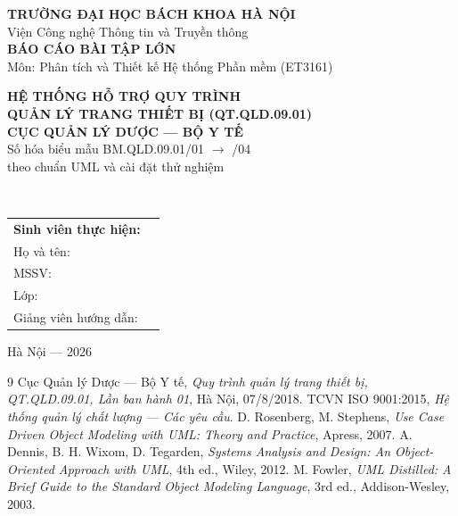 \documentclass[12pt, a4paper]{report}
\begin{document}
\begin{titlepage}
\centering
{\Large \textbf{TRƯỜNG ĐẠI HỌC BÁCH KHOA HÀ NỘI}}\\[2pt]
{\large Viện Công nghệ Thông tin và Truyền thông}\\[40pt]
{\Huge\bfseries BÁO CÁO BÀI TẬP LỚN}\\[10pt]
{\Large Môn: Phân tích và Thiết kế Hệ thống Phần mềm (ET3161)}\\[36pt]
\begin{minipage}{0.86\textwidth}
\centering
{\Large\bfseries HỆ THỐNG HỖ TRỢ QUY TRÌNH\\ QUẢN LÝ TRANG THIẾT BỊ (QT.QLD.09.01)\\[6pt]
CỤC QUẢN LÝ DƯỢC — BỘ Y TẾ}\\[14pt]
{\large Số hóa biểu mẫu BM.QLD.09.01/01 $\rightarrow$ /04\\ theo chuẩn UML và cài đặt thử nghiệm}
\end{minipage}\\[60pt]
\begin{flushright}
\begin{tabular}{ll}
\textbf{Sinh viên thực hiện:} & \\[4pt]
Họ và tên: & \underline{\hspace{6cm}} \\[8pt]
MSSV: & \underline{\hspace{6cm}} \\[8pt]
Lớp: & \underline{\hspace{6cm}} \\[8pt]
Giảng viên hướng dẫn: & \underline{\hspace{6cm}} \\
\end{tabular}
\end{flushright}
\vfill
{\large Hà Nội --- 2026}
\end{titlepage}

\tableofcontents
\listoffigures
\listoftables











\begin{thebibliography}{9}
 Cục Quản lý Dược — Bộ Y tế, \textit{Quy trình quản lý trang thiết bị, QT.QLD.09.01, Lần ban hành 01}, Hà Nội, 07/8/2018.
 TCVN ISO 9001:2015, \textit{Hệ thống quản lý chất lượng — Các yêu cầu}.
 D. Rosenberg, M. Stephens, \textit{Use Case Driven Object Modeling with UML: Theory and Practice}, Apress, 2007.
 A. Dennis, B. H. Wixom, D. Tegarden, \textit{Systems Analysis and Design: An Object-Oriented Approach with UML}, 4th ed., Wiley, 2012.
 M. Fowler, \textit{UML Distilled: A Brief Guide to the Standard Object Modeling Language}, 3rd ed., Addison-Wesley, 2003.
\end{thebibliography}
\end{document}
